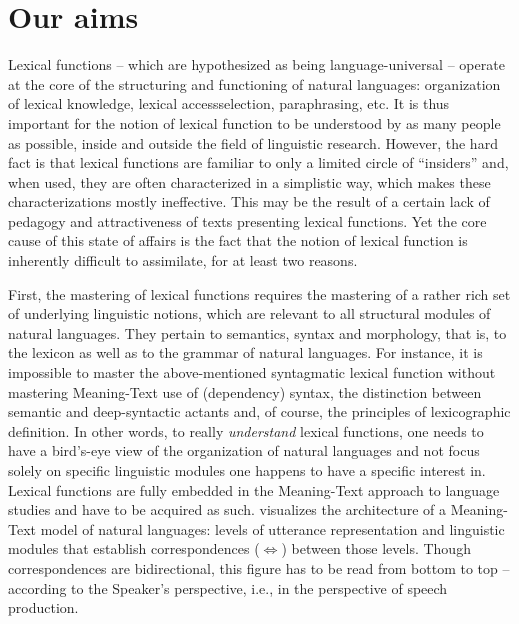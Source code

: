 \section{Our aims}

Lexical functions -- which are hypothesized as being language-universal -- operate at the core of the structuring and functioning of natural languages: organization of lexical knowledge, lexical access\slashs selection, paraphrasing, etc. It is thus important for the notion of lexical function to be understood by as many people as possible, inside and outside the field of linguistic research. However, the hard fact is that lexical functions are familiar to only a limited circle of ``insiders'' and, when used, they are often characterized in a simplistic way, which makes these characterizations mostly ineffective. This may be the result of a certain lack of pedagogy and attractiveness of texts presenting lexical functions. Yet the core cause of this state of affairs is the fact that the notion of lexical function is inherently difficult to assimilate, for at least two reasons.

First, the mastering of lexical functions requires the mastering of a rather rich set of underlying linguistic notions, which are relevant to all structural modules of natural languages. They pertain to semantics, syntax and morphology, that is, to the lexicon as well as to the grammar of natural languages. For instance, it is impossible to master the above-mentioned syntagmatic lexical function  without mastering Meaning-Text use of (dependency) syntax, the distinction between semantic and deep-syntactic actants and, of course, the principles of lexicographic definition. In other words, to really \emph{understand} lexical functions, one needs to have a bird's-eye view of the organization of natural languages and  not focus solely on specific linguistic modules one happens to have a specific interest in. Lexical functions are fully embedded in the Meaning-Text approach to language studies  \parencites{Melcuk1981a,Melcuk2016a,Kahane2003,Milicevic2006} and have to be acquired as such.  visualizes the architecture of a Meaning-Text model of natural languages: levels of utterance representation and linguistic modules that establish correspondences ($\Leftrightarrow$) between those levels. Though correspondences are bidirectional, this figure has to be read from bottom to top -- according to the Speaker's perspective, i.e., in the perspective of speech production.


